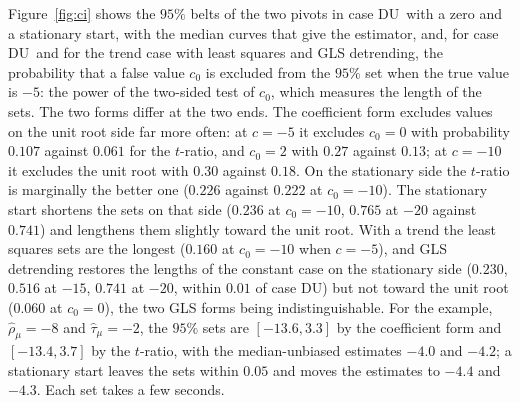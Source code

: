 \documentclass[ecta,nameyear,final]{econsocart}
\newcommand{\Fu}{\textsf{\upshape DU}}
\theoremstyle{plain}
\theoremstyle{definition}
\begin{document}
Figure~\ref{fig:ci} shows the $95\%$ belts of the two pivots in case \Fu\ with a zero and a stationary start, with the median curves that give the estimator, and, for case \Fu\ and for the trend case with least squares and GLS detrending, the probability that a false value $c_0$ is excluded from the $95\%$ set when the true value is $-5$: the power of the two-sided test of $c_0$, which measures the length of the sets.  The two forms differ at the two ends.  The coefficient form excludes values on the unit root side far more often: at $c=-5$ it excludes $c_0=0$ with probability $0.107$ against $0.061$ for the $t$-ratio, and $c_0=2$ with $0.27$ against $0.13$; at $c=-10$ it excludes the unit root with $0.30$ against $0.18$.  On the stationary side the $t$-ratio is marginally the better one ($0.226$ against $0.222$ at $c_0=-10$).  The stationary start shortens the sets on that side ($0.236$ at $c_0=-10$, $0.765$ at $-20$ against $0.741$) and lengthens them slightly toward the unit root.  With a trend the least squares sets are the longest ($0.160$ at $c_0=-10$ when $c=-5$), and GLS detrending restores the lengths of the constant case on the stationary side ($0.230$, $0.516$ at $-15$, $0.741$ at $-20$, within $0.01$ of case \Fu) but not toward the unit root ($0.060$ at $c_0=0$), the two GLS forms being indistinguishable.  For the example, $\hat\rho_\mu=-8$ and $\hat\tau_\mu=-2$, the $95\%$ sets are $[-13.6,3.3]$ by the coefficient form and $[-13.4,3.7]$ by the $t$-ratio, with the median-unbiased estimates $-4.0$ and $-4.2$; a stationary start leaves the sets within $0.05$ and moves the estimates to $-4.4$ and $-4.3$.  Each set takes a few seconds.
\end{document}
